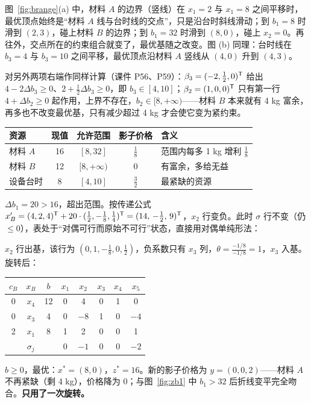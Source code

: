 图~\ref{fig:brange}(a) 中，材料 $A$ 的边界（竖线）在 $x_1=2$ 与 $x_1=8$ 之间平移时，最优顶点始终是“材料 $A$ 线与台时线的交点”，只是沿台时斜线滑动；到 $b_1=8$ 时滑到 $(2,3)$，碰上材料 $B$ 的边界；到 $b_1=32$ 时滑到 $(8,0)$，碰上 $x_2=0$。再往外，交点所在的约束组合就变了，最优基随之改变。图 (b) 同理：台时线在 $b_3=4$ 与 $b_3=10$ 之间平移，最优顶点沿材料 $A$ 竖线从 $(4,0)$ 升到 $(4,3)$。

对另外两项右端作同样计算（课件 P56、P59）：$\beta_3=(-2,\frac12,0)^{\mathsf T}$ 给出 $4-2\Delta b_3\ge0$、$2+\frac12\Delta b_3\ge0$，即 $b_3\in[4,10]$；$\beta_2=(1,0,0)^{\mathsf T}$ 只有第一行 $4+\Delta b_2\ge0$ 起作用，上界不存在，$b_2\in[8,+\infty)$——材料 $B$ 本来就有 4 kg 富余，再多也不改变最优基，只有减少超过 4 kg 才会使它变为紧约束。

\begin{table}[!htbp]\centering
\small
\begin{tabular}{@{}lcccl@{}}
\toprule
\rowcolor{lightblue}资源 & 现值 & 允许范围 & 影子价格 & 含义\\\midrule
材料 $A$ & 16 & $[8,32]$ & $\frac18$ & 范围内每多 1 kg 增利 $\frac18$\\
材料 $B$ & 12 & $[8,+\infty)$ & 0 & 有富余，多给无益\\
设备台时 & 8 & $[4,10]$ & $\frac32$ & 最紧缺的资源\\\bottomrule
\end{tabular}\par\nopagebreak[4]
\label{tab:brange}
\end{table}

\begin{examplebox}
$\Delta b_1=20>16$，超出范围。按传递公式 $x_B'=(4,2,4)^{\mathsf T}+20\cdot(\frac12,-\frac18,\frac14)^{\mathsf T}=(14,\,-\frac12,\,9)^{\mathsf T}$，$x_2$ 行变负。此时 $\sigma$ 行不变（仍 $\le0$），表处于“对偶可行而原始不可行”状态，直接用对偶单纯形法：\par
$x_2$ 行出基，该行为 $(0,1,-\frac18,0,\frac12)$，负系数只有 $x_3$ 列，$\theta=\frac{-1/8}{-1/8}=1$，$x_3$ 入基。旋转后：
\begin{center}\small
\begin{tabular}{@{}ccc|ccccc@{}}\toprule
$c_B$ & $x_B$ & $b$ & $x_1$ & $x_2$ & $x_3$ & $x_4$ & $x_5$\\\midrule
0 & $x_4$ & 12 & 0 & 4 & 0 & 1 & 0\\
0 & $x_3$ & 4 & 0 & $-8$ & 1 & 0 & $-4$\\
2 & $x_1$ & 8 & 1 & 2 & 0 & 0 & 1\\\midrule
\multicolumn{3}{c|}{$\sigma_j$} & 0 & $-1$ & 0 & 0 & $-2$\\\bottomrule
\end{tabular}
\end{center}
$b\ge0$，最优：$x^*=(8,0)$，$z^*=16$。新的影子价格为 $y=(0,0,2)$——材料 $A$ 不再紧缺（剩 4 kg），价格降为 0；与图~\ref{fig:zb1} 中 $b_1>32$ 后折线变平完全吻合。\textbf{只用了一次旋转。}
\end{examplebox}

